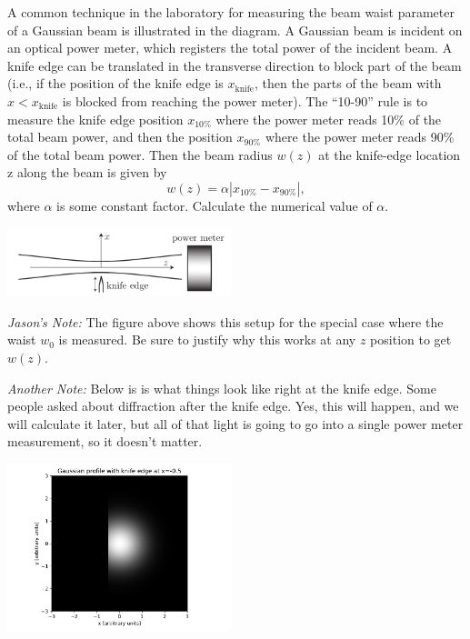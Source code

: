 \documentclass[11pt]{hmcpset}
\begin{document}
\begin{problem}
	A common technique in the laboratory for measuring the beam waist parameter of a Gaussian beam 	is illustrated in the diagram. A Gaussian beam is incident on an optical power meter, which registers 	the total power of the incident beam. A knife edge can be translated in the transverse direction to 	block part of the beam (i.e., if the position of the knife edge is $x_\mathrm{knife}$, then the parts of the beam with $x < x_\mathrm{knife}$ is blocked from reaching the power meter). The ``10-90'' rule is to measure the knife edge position $x_{10\%}$ where the power meter reads 10\% of the total beam power, and then the position	$x_{90\%}$ where the power meter reads 90\% of the total beam power. Then the beam radius $w(z)$ at the knife-edge location z along the beam is given by
	\[
	w(z) = \alpha \left| x_{10\%} - x_{90\%} \right|,
	\]
	where $\alpha$ is some constant factor. Calculate the numerical value of $\alpha$.
	
	\begin{center}
		\includegraphics[width=0.49\textwidth]{knife_edge_beam}
	\end{center}

\textit{Jason's Note:} The figure above shows this setup for the special case where the waist $w_0$ is measured. Be sure to justify why this works at any $z$ position to get $w(z)$.

\textit{Another Note:}	Below is is what things look like right at the knife edge. Some people asked about diffraction after the knife edge. Yes, this will happen, and we will calculate it later, but all of that light is going to go into a single power meter measurement, so it doesn't matter.

\begin{center}
	\includegraphics[width=0.49\textwidth]{knife_edge_gaussian}
\end{center}


\end{problem}
\end{document}
